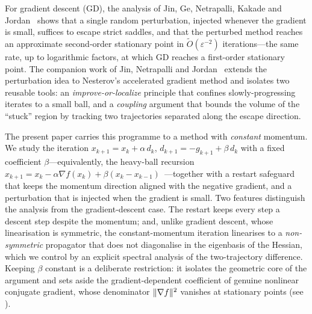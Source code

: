 \documentclass[11pt]{article}
\theoremstyle{plain}
\theoremstyle{definition}
\theoremstyle{remark}
\DeclarePairedDelimiter{\norm}{\lVert}{\rVert}
\newcommand{\grad}{\nabla}
\newcommand{\eps}{\varepsilon}
\newcommand{\Otil}{\widetilde{O}}
\begin{document}
For gradient descent (GD), the analysis of Jin, Ge, Netrapalli, Kakade
and Jordan~\cite{pmlr-v70-jin17a} shows that a single random perturbation,
injected whenever the gradient is small, suffices to escape strict
saddles, and that the perturbed method reaches an approximate
second-order stationary point in $\Otil(\eps^{-2})$ iterations---the
same rate, up to logarithmic factors, at which GD reaches a first-order
stationary point. The companion work of Jin, Netrapalli and
Jordan~\cite{pmlr-v75-jin18a} extends the perturbation idea to Nesterov's
accelerated gradient method and isolates two reusable tools: an
\emph{improve-or-localize} principle that confines slowly-progressing
iterates to a small ball, and a \emph{coupling} argument that bounds the
volume of the ``stuck'' region by tracking two trajectories separated
along the escape direction.

The present paper carries this programme to a method with
\emph{constant} momentum. We study the iteration
$x_{k+1}=x_{k}+\alpha\,d_{k}$, $d_{k+1}=-g_{k+1}+\beta\,d_{k}$ with a
fixed coefficient $\beta$---equivalently, the heavy-ball recursion
$x_{k+1}=x_{k}-\alpha\grad f(x_{k})+\beta(x_{k}-x_{k-1})$~\cite{POLYAK19641}---together
with a restart safeguard that keeps the momentum direction aligned with
the negative gradient, and a perturbation that is injected when the
gradient is small. Two features distinguish the analysis from the
gradient-descent case. The restart keeps every step a descent step
despite the momentum; and, unlike gradient descent, whose linearisation
is symmetric, the constant-momentum iteration linearises to a
\emph{non-symmetric} propagator that does not diagonalise in the
eigenbasis of the Hessian, which we control by an explicit spectral
analysis of the two-trajectory difference. Keeping $\beta$ constant is a
deliberate restriction: it isolates the geometric core of the argument
and sets aside the gradient-dependent coefficient of genuine nonlinear
conjugate gradient, whose denominator $\norm{\grad f}^{2}$ vanishes at
stationary points (see ).
\end{document}
